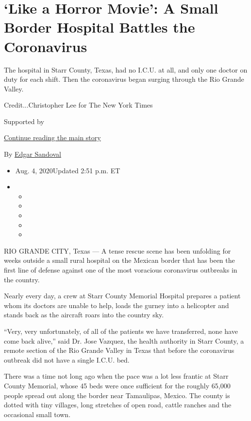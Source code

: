 \hypertarget{like-a-horror-movie-a-small-border-hospital-battles-the-coronavirus}{%
\section{`Like a Horror Movie': A Small Border Hospital Battles the
Coronavirus}\label{like-a-horror-movie-a-small-border-hospital-battles-the-coronavirus}}

The hospital in Starr County, Texas, had no I.C.U. at all, and only one
doctor on duty for each shift. Then the coronavirus began surging
through the Rio Grande Valley.

Credit...Christopher Lee for The New York Times

Supported by

\protect\hyperlink{after-sponsor}{Continue reading the main story}

By \href{https://www.nytimes3xbfgragh.onion/by/edgar-sandoval}{Edgar
Sandoval}

\begin{itemize}
\item
  Aug. 4, 2020Updated 2:51 p.m. ET
\item
  \begin{itemize}
  \item
  \item
  \item
  \item
  \item
  \end{itemize}
\end{itemize}

RIO GRANDE CITY, Texas --- A tense rescue scene has been unfolding for
weeks outside a small rural hospital on the Mexican border that has been
the first line of defense against one of the most voracious coronavirus
outbreaks in the country.

Nearly every day, a crew at Starr County Memorial Hospital prepares a
patient whom its doctors are unable to help, loads the gurney into a
helicopter and stands back as the aircraft roars into the country sky.

``Very, very unfortunately, of all of the patients we have transferred,
none have come back alive,'' said Dr. Jose Vazquez, the health authority
in Starr County, a remote section of the Rio Grande Valley in Texas that
before the coronavirus outbreak did not have a single I.C.U. bed.

There was a time not long ago when the pace was a lot less frantic at
Starr County Memorial, whose 45 beds were once sufficient for the
roughly 65,000 people spread out along the border near Tamaulipas,
Mexico. The county is dotted with tiny villages, long stretches of open
road, cattle ranches and the occasional small town.

